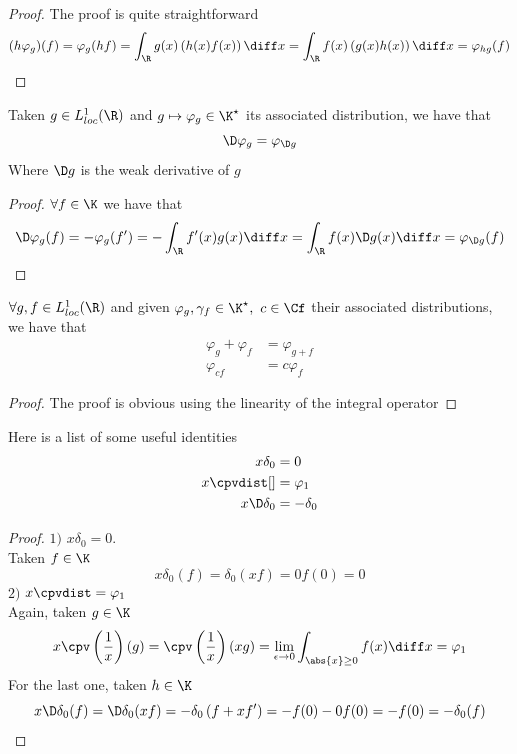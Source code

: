 \documentclass[../mmf.tex]{subfiles}
\begin{document}
\begin{proof}
	The proof is quite straightforward
	\begin{equation*}
		(h\varphi_g)(f)=\varphi_g(hf)=\int_{\R}^{}g(x)\left( h(x)f(x) \right)\diff x=\int_{\R}^{}f(x)\left( g(x)h(x) \right)\diff x=\varphi_{hg}(f)
	\end{equation*}
\end{proof}
\begin{thm}
	Taken $g\in L^1_{loc}(\R)$ and $g\mapsto\varphi_g\in\K^\star$ its associated distribution, we have that
	\begin{equation*}
		\D\varphi_g=\varphi_{\D g}
	\end{equation*}
	Where $\D g$ is the weak derivative of $g$
\end{thm}
\begin{proof}
	$\forall f\in\K$ we have that
	\begin{equation*}
		\D\varphi_g(f)=-\varphi_g(f')=-\int_{\R}^{}f'(x)g(x)\diff x=\int_{\R}^{}f(x)\D g(x)\diff x=\varphi_{\D g}(f)
	\end{equation*}
\end{proof}
\begin{thm}
	$\forall g,f\in L^1_{loc}(\R)$ and given $\varphi_g,\gamma_f\in\K^\star,\ c\in\Cf$ their associated distributions, we have that
	\begin{equation*}
		\begin{aligned}
			\varphi_g+\varphi_f&=\varphi_{g+f}\\
			\varphi_{cf}&=c\varphi_f
		\end{aligned}
	\end{equation*}
\end{thm}
\begin{proof}
	The proof is obvious using the linearity of the integral operator
\end{proof}
\begin{thm}
	Here is a list of some useful identities
	\begin{equation}
		\begin{aligned}
			x\delta_0&=0\\
			x\cpvdist[]&=\varphi_1\\
			x\D\delta_0&=-\delta_0
		\end{aligned}
		\label{eq:distitent}
	\end{equation}
\end{thm}
\begin{proof}
	$1)$ $x\delta_0=0$.\\
	Taken $f\in\K$
	\begin{equation*}
		x\delta_0(f)=\delta_0(xf)=0f(0)=0
	\end{equation*}
	$2)$ $x\cpvdist=\varphi_1$\\
	Again, taken $g\in\K$
	\begin{equation*}
		x\cpv\left( \frac{1}{x} \right)(g)=\cpv\left( \frac{1}{x} \right)(xg)=\lim_{\epsilon\to0}\int_{\abs{x}\ge0}^{}f(x)\diff x=\varphi_1
	\end{equation*}
	For the last one, taken $h\in\K$
	\begin{equation*}
		x\D\delta_0(f)=\D\delta_0(xf)=-\delta_0\left( f+xf' \right)=-f(0)-0f(0)=-f(0)=-\delta_0(f)
	\end{equation*}
\end{proof}
\end{document}
